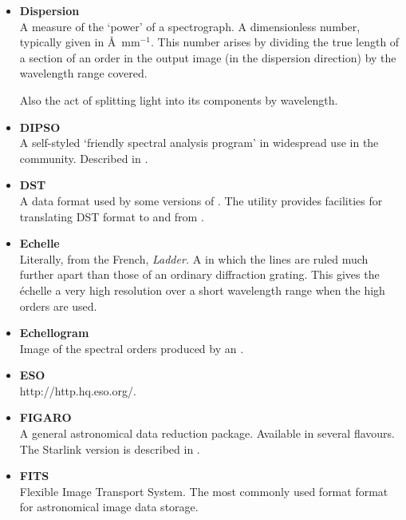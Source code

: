 \documentclass[twoside,11pt]{starlink}
\begin{document}
\begin{itemize}
\item {\bf\label{gl_dispersion}Dispersion}\\
      A measure of the `power' of a spectrograph. A dimensionless number,
      typically given in \AA\ mm${}^{-1}$.  This number arises by dividing
      the true
      length of a section of an order in the output image (in the
      dispersion direction) by the wavelength range covered.

      Also the act of splitting light into its components by wavelength.

\item {\bf\label{gl_dipso}DIPSO}\\
      A self-styled `friendly spectral analysis program' in
      widespread use in the community.  Described in
      .

\item {\bf\label{gl_dst}DST}\\
      A data format used by some versions of .
      The  utility provides facilities for
      translating DST format to and from .

\item {\bf\label{gl_echelle}Echelle}\\
      Literally, from the French, {\sl Ladder.}
      A  in which the
      lines are ruled much further apart than those of an ordinary
      diffraction grating.  This gives the \'{e}chelle a very high
      resolution over a short wavelength range when the high orders are
      used.

\item {\bf\label{gl_echellogram}Echellogram}\\
      Image of the spectral orders produced by an
      .

\item {\bf\label{gl_eso}ESO}\\
      {http://http.hq.eso.org/}.

\item {\bf\label{gl_figaro}FIGARO}\\
      A general astronomical data reduction package.  Available in
      several flavours.  The Starlink version is described in
      .

\item {\bf\label{gl_fits}FITS}\\
      Flexible Image Transport System.  The most commonly used format
      format for astronomical image data storage.


\end{itemize}
\end{document}

